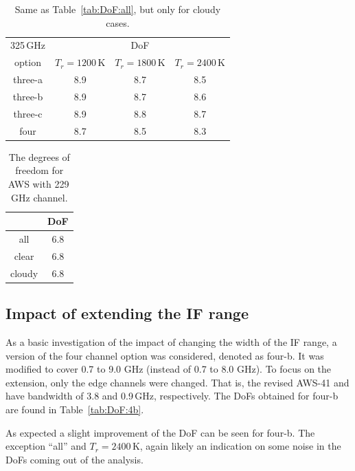 \documentclass[12pt]{article}
\begin{document}
\begin{table}[!p]
	\centering
	\begin{tabular}[b]{c|c|c|c}
	325\,GHz & \multicolumn{3}{c}{DoF}   \\
	option &  $T_r = 1200 $\,K &   $T_r = 1800 $\,K &   $T_r = 2400$\,K \\
		\hline
		three-a &              8.9 &              8.7 &              8.5 \\		
		three-b &              8.9 &              8.7 &              8.6 \\		
		three-c &              8.9 &              8.8 &              8.7 \\		
		four    &              8.7 &              8.5 &              8.3 \\
		\hline
	\end{tabular}
	\caption{Same as Table~\ref{tab:DoF:all}, but only for cloudy cases.  }
	\label{tab:DoF:cloudy}
\end{table}

\begin{table}[!p]
	\centering
	\begin{tabular}[b]{c|c}
		&   DoF \\
		\hline
		all    &      6.8        \\
		clear  &      6.8        \\
		cloudy &      6.8        \\
		\hline
	\end{tabular}
	\caption{The degrees of freedom for AWS with 229\,GHz channel. }
	\label{tab:DoF:4X}
\end{table}


\subsection{Impact of extending the IF range}
%
As a basic investigation of the impact of changing the width of the IF range, a
version of the four channel option was considered, denoted as four-b. It was
modified to cover 0.7 to 9.0 GHz (instead of 0.7 to 8.0 GHz). To focus on the
extension, only the edge channels were changed. That is, the revised AWS-41 and
have bandwidth of 3.8 and 0.9\,GHz, respectively. The DoFs obtained for four-b
are found in Table~\ref{tab:DoF:4b}.

As expected a slight improvement of the DoF can be seen for four-b. The
exception ``all'' and $T_r=2400$\,K, again likely an indication on some noise
in the DoFs coming out of the analysis.
\end{document}

